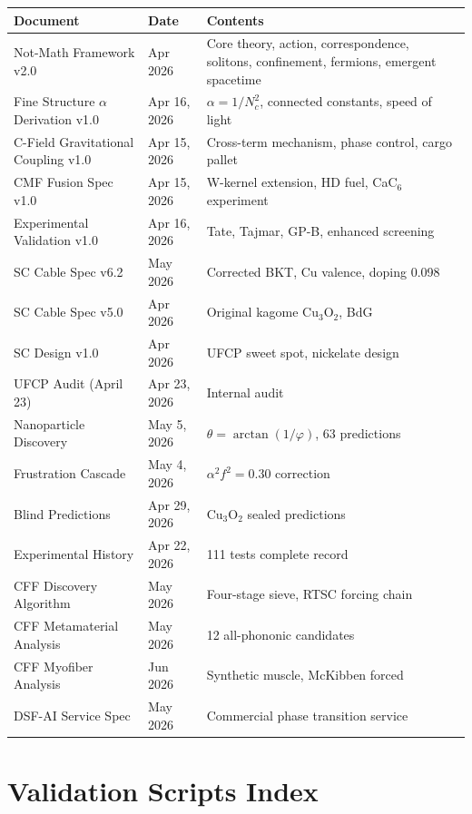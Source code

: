 \documentclass[11pt, a4paper]{article}
\begin{document}
\begin{center}
\begin{longtable}{@{}p{5.5cm}lp{5.5cm}@{}}
\toprule
\textbf{Document} & \textbf{Date} & \textbf{Contents} \\
\midrule
\endhead
Not-Math Framework v2.0 & Apr 2026 & Core theory, action, correspondence,
  solitons, confinement, fermions, emergent spacetime \\
Fine Structure $\alpha$ Derivation v1.0 & Apr 16, 2026 &
  $\alpha = 1/N_c^2$, connected constants, speed of light \\
C-Field Gravitational Coupling v1.0 & Apr 15, 2026 &
  Cross-term mechanism, phase control, cargo pallet \\
CMF Fusion Spec v1.0 & Apr 15, 2026 & W-kernel extension, HD fuel,
  CaC$_6$ experiment \\
Experimental Validation v1.0 & Apr 16, 2026 & Tate, Tajmar, GP-B,
  enhanced screening \\
SC Cable Spec v6.2 & May 2026 & Corrected BKT, Cu valence,
  doping 0.098 \\
SC Cable Spec v5.0 & Apr 2026 & Original kagome Cu$_3$O$_2$, BdG \\
SC Design v1.0 & Apr 2026 & UFCP sweet spot, nickelate design \\
UFCP Audit (April 23) & Apr 23, 2026 & Internal audit \\
Nanoparticle Discovery & May 5, 2026 & $\theta = \arctan(1/\varphi)$,
  63 predictions \\
Frustration Cascade & May 4, 2026 & $\alpha^2 f^2 = 0.30$ correction \\
Blind Predictions & Apr 29, 2026 & Cu$_3$O$_2$ sealed predictions \\
Experimental History & Apr 22, 2026 & 111 tests complete record \\
CFF Discovery Algorithm & May 2026 & Four-stage sieve, RTSC forcing chain \\
CFF Metamaterial Analysis & May 2026 & 12 all-phononic candidates \\
CFF Myofiber Analysis & Jun 2026 & Synthetic muscle, McKibben forced \\
DSF-AI Service Spec & May 2026 & Commercial phase transition service \\
\bottomrule
\end{longtable}
\end{center}

\section{Validation Scripts Index}
\end{document}
